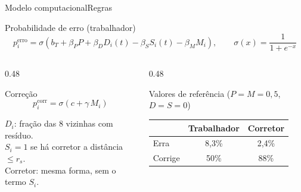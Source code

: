 \documentclass[aspectratio=169, 10pt]{beamer}
\begin{document}
\begin{frame}{Modelo computacional}{Regras}
  \begin{block}{Probabilidade de erro (trabalhador)}
    \vspace{-8pt}
    \[
      p^{\text{erro}}_i=\sigma\!\left(b_T+\beta_P P+\beta_D D_i(t)-\beta_S S_i(t)-\beta_M M_i\right),
      \qquad \sigma(x)=\frac{1}{1+e^{-x}}
    \]
    \vspace{-10pt}
  \end{block}
  \begin{columns}[T]
    \begin{column}{0.48\textwidth}
      \begin{block}{Correção}
        \vspace{-8pt}
        \[ p^{\text{corr}}_i=\sigma\!\left(c+\gamma\, M_i\right) \]
        \vspace{-12pt}
      \end{block}
      \small
      $D_i$: fração das 8 vizinhas com resíduo.\\
      $S_i=1$ se há corretor a distância $\le r_s$.\\
      Corretor: mesma forma, sem o termo $S_i$.
    \end{column}
    \begin{column}{0.48\textwidth}
      \begin{exampleblock}{Valores de referência ($P=M=0{,}5$, $D=S=0$)}
        \small
        \begin{tabular}{@{}lcc@{}}
          \toprule
          & Trabalhador & Corretor \\
          \midrule
          Erra & 8,3\% & 2,4\% \\
          Corrige & 50\% & 88\% \\
          \bottomrule
        \end{tabular}
      \end{exampleblock}
    \end{column}
  \end{columns}
\end{frame}
\end{document}
